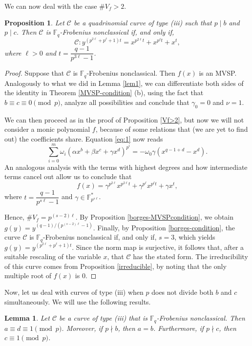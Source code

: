 \documentclass[preprint,12pt]{elsarticle}
\newtheorem{lemma}[theorem]{Lemma}
\newtheorem{proposition}[theorem]{Proposition}
\begin{document}
We can now deal with the case $\# V_f > 2$.

\begin{proposition}
Let $\mathcal{C}$ be a quadrinomial curve of type (iii) such that $p \mid b$ and $p \mid c$. Then $\mathcal{C}$ is $\mathbb{F}_q$-Frobenius nonclassical if, and only if,
$$
\mathcal{C}: y^{(p^{2\ell} + p^\ell + 1)t} = x^{p^{2\ell}t} + x^{p^\ell t} + x^t,
$$
where $\ell > 0$ and $t = \dfrac{q - 1}{p^{3\ell} - 1}$.
\end{proposition}

\begin{proof}
Suppose that $\mathcal{C}$ is $\mathbb{F}_q$-Frobenius nonclassical. Then $f(x)$ is an MVSP. Analogously to what we did in Lemma \ref{lem1}, we can differentiate both sides of the identity in Theorem \ref{MVSP-condition} (b), using the fact that $b \equiv c \equiv 0 \pmod{p}$, analyze all possibilities and conclude that $\gamma_0 = 0$ and $\nu = 1$.

We can then proceed as in the proof of Proposition \ref{Vf>2}, but now we will not consider a monic polynomial $f$, because of some relations that (we are yet to find out) the coefficients share. Equation \eqref{eq:1} now reads
$$\sum_{i=0}^m\omega_i(\alpha x^b + \beta x^c + \gamma x^d)^{p^i} = -\omega_0 \gamma(x^{q-1+d} - x^d).$$
An analogous analysis with the terms with highest degrees and how intermediate terms cancel out allow us to conclude that
$$
f(x) = \gamma^{p^{2\ell}} x^{p^{2\ell}t} + \gamma^{p^\ell} x^{p^\ell t} + \gamma x^t,
$$
where $t= \dfrac{q-1}{p^{s\ell} - 1}$ and $\gamma \in \mathbb{F}_{p^{s \ell}}^*$.

Hence, $\# V_f = p^{(s-2)\ell}$. By Proposition \ref{borges-MVSPcondition}, we obtain $g(y) = y^{(q-1)/(p^{(s-2)\ell} - 1)}$. Finally, by Proposition \ref{borges-condition}, the curve $\mathcal{C}$ is $\mathbb{F}_q$-Frobenius nonclassical if, and only if, $s = 3$, which yields $g(y) = y^{(p^{2\ell} + p^\ell + 1)t}$. Since the norm map is surjective, it follows that, after a suitable rescaling of the variable $x$, that $\mathcal{C}$ has the stated form. The irreducibility of this curve comes from Proposition \ref{irreducible}, by noting that the only multiple root of $f(x)$ is $0$.
\end{proof}

Now, let us deal with curves of type (iii) when $p$ does not divide both $b$ and $c$ simultaneously. We will use the following results.

\begin{lemma}\label{lemm1}
Let $\mathcal{C}$ be a curve of type (iii) that is $\mathbb{F}_q$-Frobenius nonclassical. Then $a \equiv d \equiv 1 \pmod{p}$. Moreover, if $p \nmid b$, then $a = b$. Furthermore, if $p \nmid c$, then $c \equiv 1 \pmod{p}$.
\end{lemma}
\end{document}
